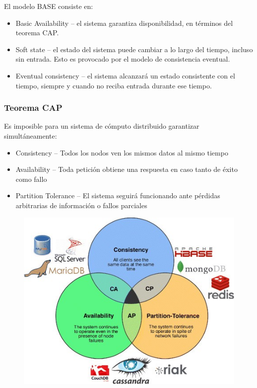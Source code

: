 \documentclass[]{book}
\providecommand{\tightlist}{%
  \setlength{\itemsep}{0pt}\setlength{\parskip}{0pt}}
\begin{document}
El modelo BASE consiste en:

\begin{itemize}
\tightlist
\item
  Basic Availability -- el sistema garantiza disponibilidad, en términos
  del teorema CAP.
\item
  Soft state -- el estado del sistema puede cambiar a lo largo del
  tiempo, incluso sin entrada. Esto es provocado por el modelo de
  consistencia eventual.
\item
  Eventual consistency -- el sistema alcanzará un estado consistente con
  el tiempo, siempre y cuando no reciba entrada durante ese tiempo.
\end{itemize}

\subsubsection{Teorema CAP}\label{teorema-cap}

Es imposible para un sistema de cómputo distribuido garantizar
simultáneamente:

\begin{itemize}
\tightlist
\item
  Consistency -- Todos los nodos ven los mismos datos al mismo tiempo
\item
  Availability -- Toda petición obtiene una respuesta en caso tanto de
  éxito como fallo
\item
  Partition Tolerance -- El sistema seguirá funcionando ante pérdidas
  arbitrarias de información o fallos parciales
\end{itemize}

\begin{figure}
\centering
\includegraphics{images/TeoremaCAP.jpg}
\caption{}
\end{figure}
\end{document}
